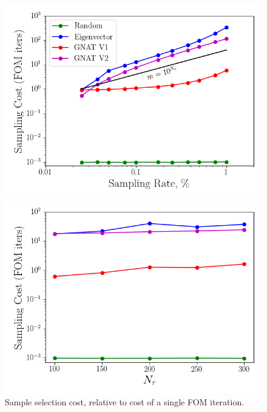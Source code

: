 \begin{figure}
	\begin{minipage}{0.49\linewidth}
		\includegraphics[width=0.99\linewidth]{Chapters/HPROMResults/Images/cvrc/deim/samp_timing_wrt_samprate.png}
	\end{minipage}
	\begin{minipage}{0.49\linewidth}
		\includegraphics[width=0.99\linewidth]{Chapters/HPROMResults/Images/cvrc/deim/samp_timing_wrt_modes.png}
	\end{minipage}
	\caption{\label{fig:cvrcSampCost}Sample selection cost, relative to cost of a single FOM iteration.}
\end{figure}

